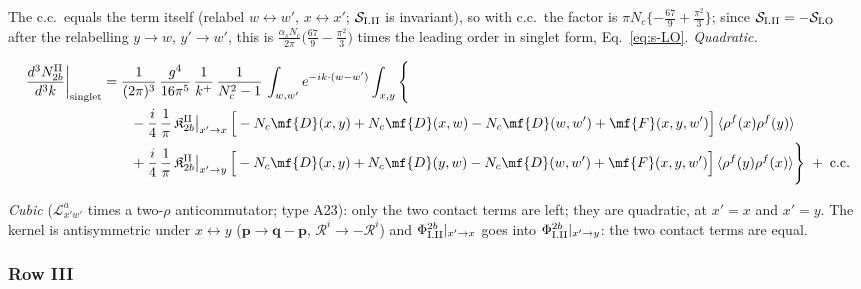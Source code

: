 The c.c.\ equals the term itself (relabel $w\leftrightarrow w'$, $x\leftrightarrow x'$; $\mathcal{S}_{\rm I.II}$ is invariant), so with c.c.\ the factor is $\pi N_{c}\{-\frac{67}{9}+\frac{\pi^{2}}{3}\}$; since $\mathcal{S}_{\rm I.II}=-\mathcal{S}_{\rm LO}$ after the relabelling $y\to w$, $y'\to w'$, this is $\frac{\alpha_{s}N_{c}}{2\pi}\big(\frac{67}{9}-\frac{\pi^{2}}{3}\big)$ times the leading order in singlet form, Eq.~\eqref{eq:s-LO}. \emph{Quadratic.}

\begin{align}
\frac{d^{3}N_{2b}^{\rm II}}{d^{3}k}\bigg|_{\rm singlet}&=\frac{1}{(2\pi)^{3}}\,\frac{g^{4}}{16\pi^{5}}\,\frac{1}{k^{+}}\,\frac{1}{N_{c}^{2}-1}\,\int_{w,w'}e^{-ik\cdot(w-w')}\int_{x,y}\Bigg\{\notag\\
&\qquad -\frac{i}{4}\,\frac{1}{\pi}\,\mathfrak{K}^{\rm II}_{2b}\big|_{x'\to x}\,\Big[-N_{c}\mf{D}(x,y)+N_{c}\mf{D}(x,w)-N_{c}\mf{D}(w,w')+\mf{F}(x,y,w')\Big]\,\langle\rho^{f}(x)\rho^{f}(y)\rangle\notag\\
&\qquad +\frac{i}{4}\,\frac{1}{\pi}\,\mathfrak{K}^{\rm II}_{2b}\big|_{x'\to y}\,\Big[-N_{c}\mf{D}(x,y)+N_{c}\mf{D}(y,w)-N_{c}\mf{D}(w,w')+\mf{F}(x,y,w')\Big]\,\langle\rho^{f}(y)\rho^{f}(x)\rangle\Bigg\}\;+\;{\rm c.c.}\label{eq:s-I-II-2b}
\end{align}

\emph{Cubic} ($\mathcal{L}^{a}_{x'w'}$ times a two-$\rho$ anticommutator; type A23): only the two contact terms are left; they are quadratic, at $x'=x$ and $x'=y$. The kernel is antisymmetric under $x\leftrightarrow y$ ($\mathbf{p}\to\mathbf{q}-\mathbf{p}$, $\mathcal{R}^{i}\to-\mathcal{R}^{i}$) and $\Phi^{2b}_{\rm I.II}|_{x'\to x}$ goes into $\Phi^{2b}_{\rm I.II}|_{x'\to y}$: the two contact terms are equal.

\subsubsection*{Row III}

